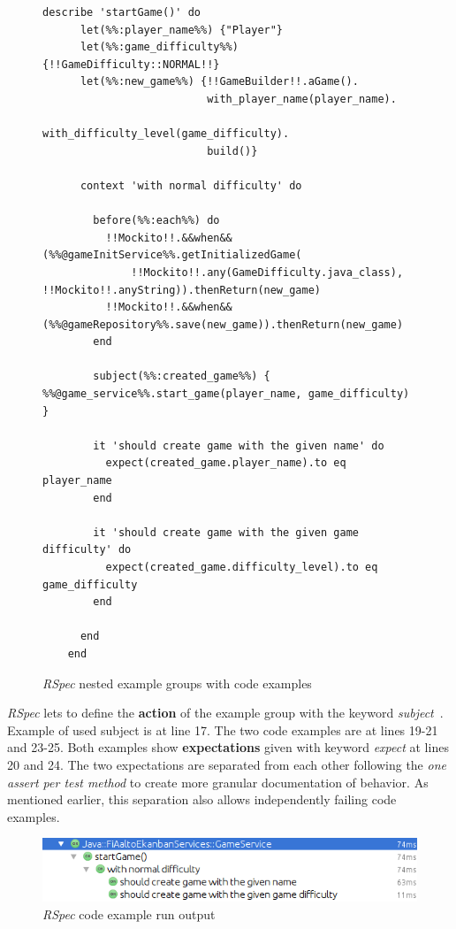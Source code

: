     \begin{figure}[H]
        \begin{lstlisting}[style=ruby]
    describe 'startGame()' do
      let(%%:player_name%%) {"Player"}
      let(%%:game_difficulty%%) {!!GameDifficulty::NORMAL!!}
      let(%%:new_game%%) {!!GameBuilder!!.aGame().
                          with_player_name(player_name).
                          with_difficulty_level(game_difficulty).
                          build()}

      context 'with normal difficulty' do

        before(%%:each%%) do
          !!Mockito!!.&&when&&(%%@gameInitService%%.getInitializedGame(
              !!Mockito!!.any(GameDifficulty.java_class), !!Mockito!!.anyString)).thenReturn(new_game)
          !!Mockito!!.&&when&&(%%@gameRepository%%.save(new_game)).thenReturn(new_game)
        end

        subject(%%:created_game%%) { %%@game_service%%.start_game(player_name, game_difficulty) }

        it 'should create game with the given name' do
          expect(created_game.player_name).to eq player_name
        end

        it 'should create game with the given game difficulty' do
          expect(created_game.difficulty_level).to eq game_difficulty
        end

      end
    end
        \end{lstlisting}
        \caption{\textit{RSpec} nested example groups with code examples}
        \label{fig:rspec-example}
    \end{figure}

    \textit{RSpec} lets to define the \textbf{action} of the example group with the keyword \textit{subject}~\cite{rspec-subject}. Example of used subject is at
    line 17. The two code examples are at lines 19-21 and 23-25.  Both examples show \textbf{expectations} given with keyword \textit{expect}
    at lines 20 and 24. The two expectations are separated from each other following the \textit{one assert per test method}
    to create more granular documentation of behavior. As mentioned earlier, this separation also allows independently failing code examples.
    \begin{figure}[H]
      \begin{center}
        \begin{topbot}[style=mdstyle]
        \includegraphics[width=\textwidth]{images/rspec-result.png}
        \end{topbot}
        \caption{\textit{RSpec} code example run output}
        \label{fig:rspec-result}
      \end{center}
    \end{figure}

